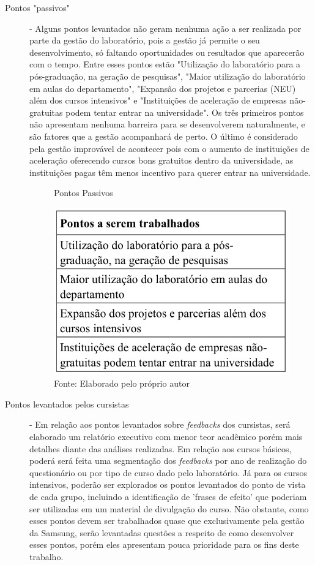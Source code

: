 \begin{description}

\item[Pontos "passivos"] - Alguns pontos levantados não geram nenhuma ação a ser realizada por parte da gestão do laboratório, pois a gestão já permite o seu desenvolvimento, só faltando oportunidades ou resultados que aparecerão com o tempo. Entre esses pontos estão "Utilização do laboratório para a pós-graduação, na geração de pesquisas", "Maior utilização do laboratório em aulas do departamento", "Expansão dos projetos e parcerias (NEU) além dos cursos intensivos" e "Instituições de aceleração de empresas não-gratuitas podem tentar entrar na universidade". Os três primeiros pontos não apresentam nenhuma barreira para se desenvolverem naturalmente, e são fatores que a gestão acompanhará de perto. O último é considerado pela gestão improvável de acontecer pois com o aumento de instituições de aceleração oferecendo cursos bons gratuitos dentro da universidade, as instituições pagas têm menos incentivo para querer entrar na universidade.

\begin{figure}[H]
\caption{Pontos Passivos}
\centerline{\includegraphics[scale=0.75]{img/pontosselecionadospassivos}}
\label{fig:pontosselecionadospassivos}
\caption* {Fonte: Elaborado pelo próprio autor}
\end{figure}

\item[Pontos levantados pelos cursistas] - Em relação aos pontos levantados sobre \textit{feedbacks} dos cursistas, será elaborado um relatório executivo com menor teor acadêmico porém mais detalhes diante das análises realizadas. Em relação aos cursos básicos, poderá será feita uma segmentação dos \textit{feedbacks} por ano de realização do questionário ou por tipo de curso dado pelo laboratório. Já para os cursos intensivos, poderão ser explorados os pontos levantados do ponto de vista de cada grupo, incluindo a identificação de 'frases de efeito' que poderiam ser utilizadas em um material de divulgação do curso. Não obstante, como esses pontos devem ser trabalhados quase que exclusivamente pela gestão da Samsung, serão levantadas questões a respeito de como desenvolver esses pontos, porém eles apresentam pouca prioridade para os fins deste trabalho.


\end{description}
